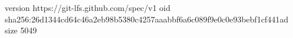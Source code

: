 version https://git-lfs.github.com/spec/v1
oid sha256:26d1344cd64c46a2eb98b5380c4257aaabbf6a6c089f9e0c0e93bebf1cf441ad
size 5049
